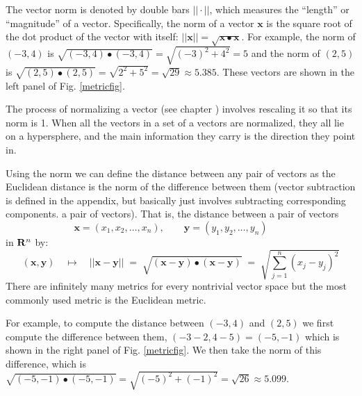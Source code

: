 The vector norm is denoted by double bars $|| \cdot ||$, which measures the ``length'' or 
``magnitude'' of a vector. Specifically, the norm of a vector $\mathbf{x}$ is 
the square root of the dot product of the vector with itself: $||\mathbf{x}|| = 
\sqrt{\mathbf{x} \bullet \mathbf{x}}$. For example, the norm of $(-3,4)$ is $\sqrt{(-3,4) \bullet (-3,4)}  = \sqrt{(-3)^2+4^2} = 5$ and the norm 
of $(2,5)$ is $ \sqrt{(2,5) \bullet (2,5)} = \sqrt{2^2+5^2} =  \sqrt{29} \approx 5.385$. These vectors are 
shown in the left panel of Fig. \ref{metricfig}. 

The process of normalizing a vector (see chapter ) involves rescaling it so that its norm is 1. When all the vectors in a set of a vectors are normalized, they all lie on a hypersphere, and the main information they carry is the direction they point in.

Using the norm we can define the distance between any pair of vectors  as the Euclidean distance is the norm of the difference between them (vector subtraction is defined in the appendix, but basically just involves subtracting corresponding components. 
 a pair of vectors). That is, the distance between a pair of vectors
\begin{equation*}
\mathbf{x} = (x_1, x_2, \ldots, x_n), \qquad
\mathbf{y} = (y_1, y_2, \ldots, y_n) \qquad
\end{equation*}
in ${\bf R}^n$ by:
\begin{equation*}
\left(\mathbf{x}, \mathbf{y}\right) \quad \mapsto \quad
|| \mathbf{x} - \mathbf{y} || \; = \; 
\sqrt{ (\mathbf{x} - \mathbf{y}) \bullet (\mathbf{x} - \mathbf{y}) }
\; = \;  \sqrt{ \sum_{j=1}^n (x_j - y_j)^2 }
\end{equation*}
There are infinitely many metrics for every nontrivial vector space but the 
most commonly used metric is the Euclidean metric.

For example, to compute the distance between $(-3,4)$ and $(2,5)$ we first compute the difference between them, 
$(-3 -2,  4- 5) = (-5,-1)$ which is shown in the right 
panel of Fig. \ref{metricfig}. We then take the norm of this difference, which is $ \sqrt{ (-5,-1) \bullet  (-5,-1)}  = \sqrt{(-5)^2+(-1)^2} 
= \sqrt{26} \approx 5.099$.

